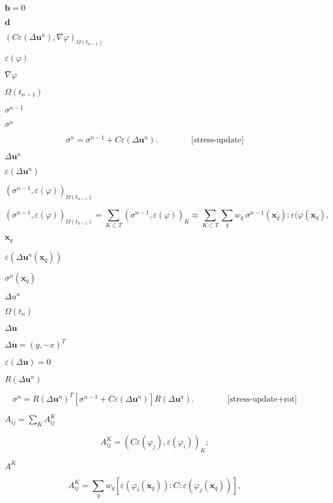 \documentclass{article}
\begin{document}
$\mathbf{b} = 0$
\pagebreak

$\mathbf{d}$
\pagebreak

$(C \varepsilon(\Delta\mathbf{u}^n), \nabla \varphi )_{\Omega(t_{n-1})}$
\pagebreak

$\varepsilon(\varphi)$
\pagebreak

$\nabla\varphi$
\pagebreak

$\Omega(t_{n-1})$
\pagebreak

$\sigma^{n-1}$
\pagebreak

$\sigma^n$
\pagebreak

\[ \sigma^n = \sigma^{n-1} + C \varepsilon (\Delta \mathbf{u}^n). \qquad \qquad \textrm{[stress-update]} \]
\pagebreak

$\Delta\mathbf{u}^n$
\pagebreak

$\varepsilon(\Delta\mathbf{u}^n)$
\pagebreak

$(\sigma^{n-1},\varepsilon(\varphi))_{\Omega(t_{n-1})}$
\pagebreak

\[ (\sigma^{n-1},\varepsilon(\varphi))_{\Omega(t_{n-1})} = \sum_{K\subset {T}} (\sigma^{n-1},\varepsilon(\varphi))_K \approx \sum_{K\subset {T}} \sum_q w_q \ \sigma^{n-1}(\mathbf{x}_q) : \varepsilon(\varphi(\mathbf{x}_q), \]
\pagebreak

$\mathbf{x}_q$
\pagebreak

$\varepsilon(\Delta \mathbf{u}^n(\mathbf{x}_q))$
\pagebreak

$\sigma^n(\mathbf{x}_q)$
\pagebreak

$\Delta u^n$
\pagebreak

$\Omega(t_n)$
\pagebreak

$\Delta\mathbf{u}$
\pagebreak

$\Delta\mathbf{u}=(y, -x)^T$
\pagebreak

$\varepsilon(\Delta \mathbf{u})=0$
\pagebreak

$R(\Delta \mathbf{u}^n)$
\pagebreak

\[ \sigma^n = R(\Delta \mathbf{u}^n)^T [\sigma^{n-1} + C \varepsilon (\Delta \mathbf{u}^n)] R(\Delta \mathbf{u}^n). \qquad \qquad \textrm{[stress-update+rot]} \]
\pagebreak

$A_{ij} = \sum_K A^K_{ij}$
\pagebreak

\[ A^K_{ij} = (C \varepsilon(\varphi_j), \varepsilon(\varphi_i))_K; \]
\pagebreak

$A^K$
\pagebreak

\[ A^K_{ij} = \sum_q w_q [\varepsilon(\varphi_i(\mathbf{x}_q)) : C : \varepsilon(\varphi_j(\mathbf{x}_q))], \]
\pagebreak
\end{document}
